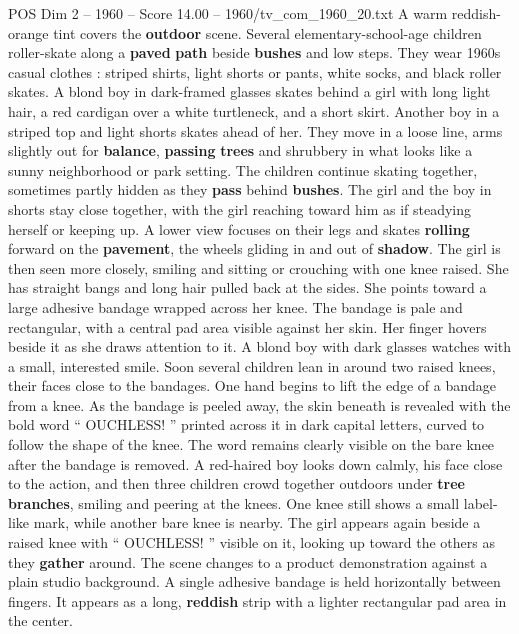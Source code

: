 \begin{textsample}{POS Dim 2 – 1960 – Score 14.00 – 1960/tv\_com\_1960\_20.txt}  \label{ex:f2_pos_018}
A warm reddish-orange tint covers the \textbf{outdoor} scene.
Several elementary-school-age children roller-skate along a \textbf{paved} \textbf{path} beside \textbf{bushes} and low steps.
They wear 1960s casual clothes : striped shirts, light shorts or pants, white socks, and black roller skates.
A blond boy in dark-framed glasses skates behind a girl with long light hair, a red cardigan over a white turtleneck, and a short skirt.
Another boy in a striped top and light shorts skates ahead of her.
They move in a loose line, arms slightly out for \textbf{balance}, \textbf{passing} \textbf{trees} and shrubbery in what looks like a sunny neighborhood or park setting.
The children continue skating together, sometimes partly hidden as they \textbf{pass} behind \textbf{bushes}.
The girl and the boy in shorts stay close together, with the girl reaching toward him as if steadying herself or keeping up.
A lower view focuses on their legs and skates \textbf{rolling} forward on the \textbf{pavement}, the wheels gliding in and out of \textbf{shadow}.
The girl is then seen more closely, smiling and sitting or crouching with one knee raised.
She has straight bangs and long hair pulled back at the sides.
She points toward a large adhesive bandage wrapped across her knee.
The bandage is pale and rectangular, with a central pad area visible against her skin.
Her finger hovers beside it as she draws attention to it.
A blond boy with dark glasses watches with a small, interested smile.
Soon several children lean in around two raised knees, their faces close to the bandages.
One hand begins to lift the edge of a bandage from a knee.
As the bandage is peeled away, the skin beneath is revealed with the bold word “ OUCHLESS! ” printed across it in dark capital letters, curved to follow the shape of the knee.
The word remains clearly visible on the bare knee after the bandage is removed.
A red-haired boy looks down calmly, his face close to the action, and then three children crowd together outdoors under \textbf{tree} \textbf{branches}, smiling and peering at the knees.
One knee still shows a small label-like mark, while another bare knee is nearby.
The girl appears again beside a raised knee with “ OUCHLESS! ” visible on it, looking up toward the others as they \textbf{gather} around.
The scene changes to a product demonstration against a plain studio background.
A single adhesive bandage is held horizontally between fingers.
It appears as a long, \textbf{reddish} strip with a lighter rectangular pad area in the center.

\end{textsample}
